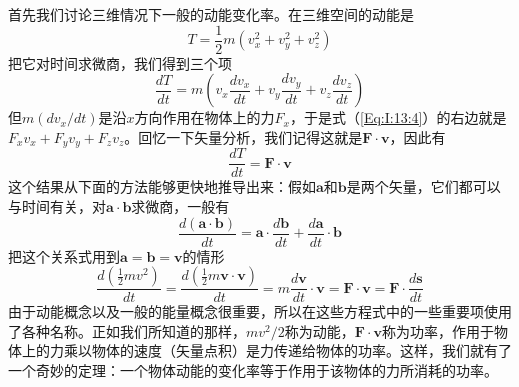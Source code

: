 首先我们讨论三维情况下一般的动能变化率。在三维空间的动能是
\begin{equation*}
    T=\frac{1}{2}m(v_x^2+v_y^2+v_z^2)
\end{equation*}
把它对时间求微商，我们得到三个项
\begin{equation}
    \label{Eq:I:13:4}
    \frac{dT}{dt}=m(v_x\frac{dv_x}{dt}+v_y\frac{dv_y}{dt}+v_z\frac{dv_z}{dt})
\end{equation}
但$m(dv_x/dt)$是沿$x$方向作用在物体上的力$F_x$，于是式（\ref{Eq:I:13:4}）的右边就是$F_xv_x+F_yv_y+F_zv_z$。回忆一下矢量分析，我们记得这就是$\boldsymbol{F} \cdot \boldsymbol{v}$，因此有
\begin{equation}
    \label{Eq:I:13:5}
    \frac{dT}{dt}=\boldsymbol{F} \cdot \boldsymbol{v}
\end{equation}
这个结果从下面的方法能够更快地推导出来：假如$\boldsymbol{a}$和$\boldsymbol{b}$是两个矢量，它们都可以与时间有关，对$\boldsymbol{a} \cdot \boldsymbol{b}$求微商，一般有
\begin{equation}
    \label{Eq:I:13:6}
    \frac{d(\boldsymbol{a} \cdot \boldsymbol{b})}{dt}=\boldsymbol{a} \cdot \frac{d\boldsymbol{b}}{dt} + \frac{d\boldsymbol{a}}{dt} \cdot \boldsymbol{b}
\end{equation}
把这个关系式用到$\boldsymbol{a}=\boldsymbol{b}=\boldsymbol{v}$的情形
\begin{equation}
    \label{Eq:I:13:7}
    \frac{d(\frac{1}{2}mv^2)}{dt}=\frac{d(\frac{1}{2}m\boldsymbol{v} \cdot \boldsymbol{v})}{dt}=m\frac{d \boldsymbol{v}}{dt} \cdot \boldsymbol{v}=\boldsymbol{F} \cdot \boldsymbol{v}=\boldsymbol{F} \cdot \frac{d \boldsymbol{s}}{dt}
\end{equation}
由于动能概念以及一般的能量概念很重要，所以在这些方程式中的一些重要项使用了各种名称。正如我们所知道的那样，$mv^2/2$称为动能，$\boldsymbol{F} \cdot \boldsymbol{v}$称为功率，作用于物体上的力乘以物体的速度（矢量点积）是力传递给物体的功率。这样，我们就有了一个奇妙的定理：一个物体动能的变化率等于作用于该物体的力所消耗的功率。

